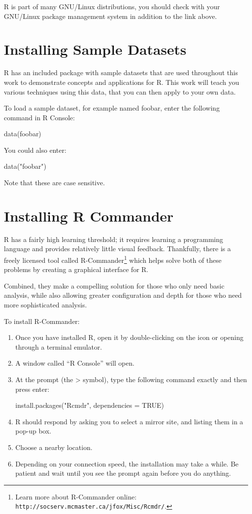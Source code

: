 R is part of many GNU/Linux distributions, you should check with your GNU/Linux package management system in addition to the link above.

\section{Installing Sample Datasets}
R has an included package with sample datasets that are used throughout this work to demonstrate concepts and applications for R. This work will teach you various techniques using this data, that you can then apply to your own data.

To load a sample dataset, for example named foobar, enter the following command in R Console:

data(foobar)

You could also enter:

data("foobar")

Note that these are case sensitive.

\section{Installing R Commander}
R has a fairly high learning threshold; it requires learning a programming language and provides relatively little visual feedback. Thankfully, there is a freely licensed tool called R-Commander\footnote{Learn more about R-Commander online: \texttt{http://socserv.mcmaster.ca/jfox/Misc/Rcmdr/}.} which helps solve both of these problems by creating a graphical interface for R.

Combined, they make a compelling solution for those who only need basic analysis, while also allowing greater configuration and depth for those who need more sophisticated analysis.

To install R-Commander:

\begin{enumerate}
 \item Once you have installed R, open it by double-clicking on the icon or opening through a terminal emulator.
 \item A window called “R Console” will open.
 \item At the prompt (the > symbol), type the following command exactly and then press enter:

install.packages("Rcmdr", dependencies = TRUE)

 \item R should respond by asking you to select a mirror site, and listing them in a pop-up box.
 \item Choose a nearby location.
 \item Depending on your connection speed, the installation may take a while. Be patient and wait until you see the prompt again before you do anything.
 \end{enumerate}
 
